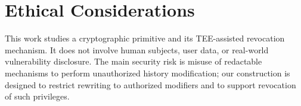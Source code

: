 \documentclass[sigconf]{acmart} %
\begin{document}
\section{Ethical Considerations}

This work studies a cryptographic primitive and its TEE-assisted revocation mechanism. It does not involve human subjects, user data, or real-world vulnerability disclosure. The main security risk is misuse of redactable mechanisms to perform unauthorized history modification; our construction is designed to restrict rewriting to authorized modifiers and to support revocation of such privileges.


\end{document}

